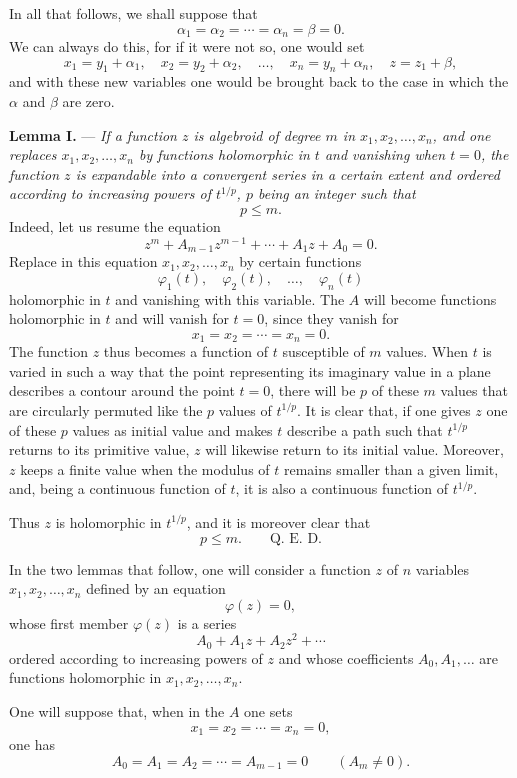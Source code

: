 \documentclass[11pt]{article}
\begin{document}
In all that follows, we shall suppose that
\[
\alpha_1=\alpha_2=\cdots=\alpha_n=\beta=0.
\]
We can always do this, for if it were not so, one would set
\[
x_1=y_1+\alpha_1,
\quad x_2=y_2+\alpha_2,
\quad \ldots,
\quad x_n=y_n+\alpha_n,
\quad z=z_1+\beta,
\]
and with these new variables one would be brought back to the case in which the $\alpha$ and $\beta$ are zero.

\medskip
\noindent\textbf{Lemma I.} — \emph{If a function $z$ is algebroid of degree $m$ in $x_1,x_2,\ldots,x_n$, and one replaces $x_1,x_2,\ldots,x_n$ by functions holomorphic in $t$ and vanishing when $t=0$, the function $z$ is expandable into a convergent series in a certain extent and ordered according to increasing powers of $t^{1/p}$, $p$ being an integer such that}
\[
p\le m.
\]
Indeed, let us resume the equation
\[
z^m+A_{m-1}z^{m-1}+\cdots+A_1z+A_0=0.
\]
Replace in this equation $x_1,x_2,\ldots,x_n$ by certain functions
\[
\varphi_1(t),\quad \varphi_2(t),\quad \ldots,
\quad \varphi_n(t)
\]
holomorphic in $t$ and vanishing with this variable. The $A$ will become functions holomorphic in $t$ and will vanish for $t=0$, since they vanish for
\[
x_1=x_2=\cdots=x_n=0.
\]
The function $z$ thus becomes a function of $t$ susceptible of $m$ values. When $t$ is varied in such a way that the point representing its imaginary value in a plane describes a contour around the point $t=0$, there will be $p$ of these $m$ values that are circularly permuted like the $p$ values of $t^{1/p}$. It is clear that, if one gives $z$ one of these $p$ values as initial value and makes $t$ describe a path such that $t^{1/p}$ returns to its primitive value, $z$ will likewise return to its initial value. Moreover, $z$ keeps a finite value when the modulus of $t$ remains smaller than a given limit, and, being a continuous function of $t$, it is also a continuous function of $t^{1/p}$.

Thus $z$ is holomorphic in $t^{1/p}$, and it is moreover clear that
\[
p\le m. \qquad \text{Q. E. D.}
\]

In the two lemmas that follow, one will consider a function $z$ of $n$ variables $x_1,x_2,\ldots,x_n$ defined by an equation
\[
\varphi(z)=0,
\]
whose first member $\varphi(z)$ is a series
\[
A_0+A_1z+A_2z^2+\cdots
\]
ordered according to increasing powers of $z$ and whose coefficients $A_0,A_1,\ldots$ are functions holomorphic in $x_1,x_2,\ldots,x_n$.

One will suppose that, when in the $A$ one sets
\[
x_1=x_2=\cdots=x_n=0,
\]
one has
\[
A_0=A_1=A_2=\cdots=A_{m-1}=0
\qquad (A_m\ne0).
\]
\end{document}
